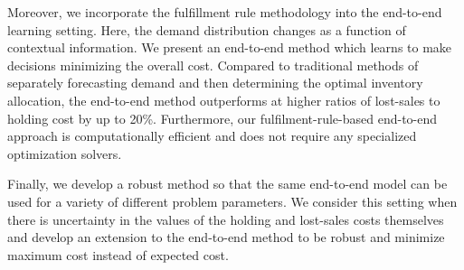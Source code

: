 \documentclass[poms,final,blindrev]{poms1_V1} %
\begin{document}
Moreover, we incorporate the fulfillment rule methodology into the end-to-end learning setting. Here, the demand distribution changes as a function of contextual information. We present an end-to-end method which learns to make decisions minimizing the overall cost. Compared to traditional methods of separately forecasting demand and then determining the optimal inventory allocation, the end-to-end method outperforms at higher ratios of lost-sales to holding cost by up to 20\%. Furthermore, our fulfilment-rule-based end-to-end approach is computationally efficient and does not require any specialized optimization solvers. 

Finally, we develop a robust method so that the same end-to-end model can be used for a variety of different problem parameters. We consider this setting when there is uncertainty in the values of the holding and lost-sales costs themselves and develop an extension to the end-to-end method to be robust and minimize maximum cost instead of expected cost.


\newpage 


 \let\oldbibliography\thebibliography
 \renewcommand{\thebibliography}[1]{%
    \oldbibliography{#1}%
    \baselineskip14pt %
    \setlength{\itemsep}{10pt}%
 }




\end{document}
